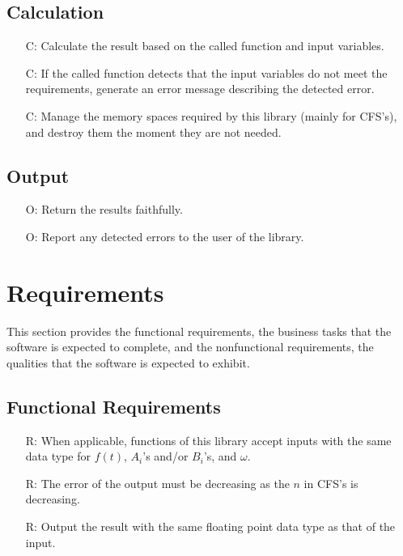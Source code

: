 \documentclass[12pt]{article}
\newcounter{calnum} %
\newcounter{outputnum} %
\newcounter{reqnum} %
\begin{document}
\subsection{Calculation} \label{sec_Calculation}
\begin{itemize}
\item[C\refstepcounter{calnum}\thecalnum \label{Cal:Normal}:] Calculate the result based on the called function and input variables.
\item[C\refstepcounter{calnum}\thecalnum \label{Cal:Error}:] If the called function detects that the input variables do not meet the requirements, generate an error message describing the detected error.
\item[C\refstepcounter{calnum}\thecalnum \label{Cal:Memory}:] Manage the memory spaces required by this library (mainly for CFS's), and destroy them the moment they are not needed.

\end{itemize}
\subsection{Output} \label{sec_Output}    
\begin{itemize}
\item[O\refstepcounter{outputnum}\theoutputnum \label{Output:Faithful}:] Return the results faithfully.
\item[O\refstepcounter{outputnum}\theoutputnum \label{Output:Error}:] Report any detected errors to the user of the library.
\end{itemize}
\section{Requirements}\label{Sc:Req}

This section provides the functional requirements, the business tasks that the
software is expected to complete, and the nonfunctional requirements, the
qualities that the software is expected to exhibit.

\subsection{Functional Requirements}

\noindent \begin{itemize}

\item[R\refstepcounter{reqnum}\thereqnum \label{R:InputDataType}:] When applicable, functions of this library accept inputs with the same data type for $f(t)$, $A_i$'s and/or $B_i$'s, and $\omega$. 
\item[R\refstepcounter{reqnum}\thereqnum \label{R:OutputError}:] The error of the output must be decreasing as the $n$ in CFS's is decreasing.
\item[R\refstepcounter{reqnum}\thereqnum \label{R:OutputDataType}:] Output the result with the same floating point data type as that of the input.
\end{itemize}
\end{document}
